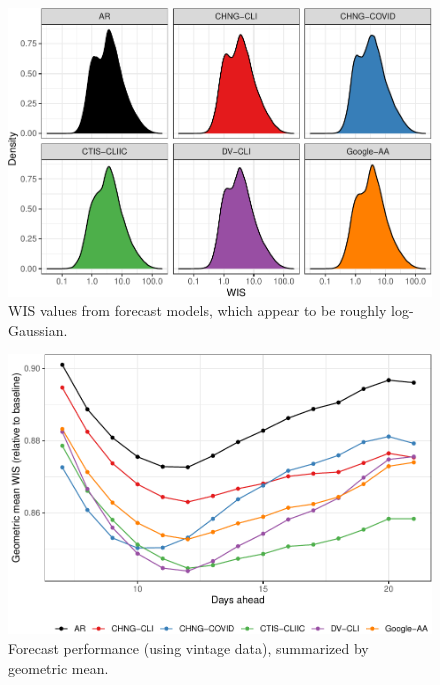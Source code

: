\clearpage

\begin{figure}

{\centering \includegraphics[width=\textwidth]{fig/wis-densities-1} 

}

\caption{WIS values from forecast models, which appear to be roughly log-Gaussian.}\label{fig:wis-densities}
\end{figure}

\clearpage

\begin{figure}

{\centering \includegraphics[width=\textwidth]{fig/fcast-adjusted-1} 

}

\caption{Forecast performance (using vintage data), summarized by geometric mean.}\label{fig:fcast-adjusted}
\end{figure}

